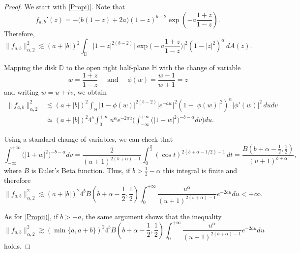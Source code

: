 \documentclass[12pt]{amsart}
\theoremstyle{definition}
\newcommand{\D}{\mathbb{{D}}}
\numberwithin{equation}{section}
\begin{document}
        \begin{proof}
    
           We start with \ref{Propi)}. Note that
                \[
                    f_{a,b}'(z) = -\big(b(1-z) + 2a\big) (1-z)^{b-2}\exp\left(-a \frac{1+z}{1-z}\right).
                \]
                Therefore,
                \[
                    \|f_{a,b}\|_{\alpha,2}^2 \lesssim (a+|b|)^2 \int_{\mathbb{D}} |1-z|^{2(b-2)} \bigg|\exp\bigg(-a\frac{1+z}{1-z}\bigg)\bigg|^{2} (1-|z|^2)^{\alpha} \, dA(z).
                \]
                
            Mapping the disk $\D$ to the open right half-plane $\mathbb{H}$ with the change of variable
                \[
                    w = \frac{1+z}{1-z} \quad \mbox{ and } \quad \phi(w) = \frac{w - 1}{w +1} = z
                \]
                and writing $w = u + i v$, we obtain
                \[
                \begin{aligned}
                    \|f_{a,b}\|_{\alpha,2}^2 & \lesssim (a+|b|)^2 \int_\mathbb{H} |1-\phi(w)|^{2(b-2)} |e^{-aw}|^{2} (1-|\phi(w)|^2)^{\alpha} |\phi'(w)|^2\, du dv \\
                    & \simeq (a + |b|)^2 4^b \int_0^{+\infty} u^{\alpha} e^{-2au} \Bigg(\int_{-\infty}^{+\infty} \big(|1+w|^2\big)^{-b-\alpha} dv\Bigg) du.
                \end{aligned}
                \]
        
            Using a standard change of variables, we can check that
                \[
                    \int_{-\infty}^{+\infty} \big(|1+w|^2\big)^{-b-\alpha} dv  = \dfrac{2}{(u+1)^{2(b+\alpha)-1}} \int_0^{\frac{\pi}{2}} (\cos t)^{2(b+\alpha - 1/2) - 1} \, dt = \dfrac{B \left( b + \alpha - \frac{1}{2}, \frac{1}{2} \right)}{(u + 1)^{b + \alpha}},
                \]
                where $B$ is Euler's Beta function. Thus, if $b > \frac{1}{2} - \alpha$ this integral is finite and therefore
                \[
                    \|f_{a,b}\|_{\alpha,2}^2 \lesssim (a + |b|)^2 4^b B \left( b + \alpha - \frac{1}{2}, \frac{1}{2} \right) \int_0^{+\infty} \dfrac{u^\alpha}{(u + 1)^{2(b+\alpha) - 1}} e^{-2au} du < +\infty.
                \]
    
            As for \ref{Propii)}, if $b > -a$, the same argument shows that the inequality
            \[
                \|f_{a,b}\|_{\alpha,2}^2 \gtrsim (\min\{a,a+b\})^2 4^b B \left( b + \alpha - \frac{1}{2}, \frac{1}{2} \right) \int_0^{+\infty} \dfrac{u^\alpha}{(u + 1)^{2(b+\alpha) - 1}} e^{-2au} du
            \]
            holds.
        \end{proof}
\end{document}
